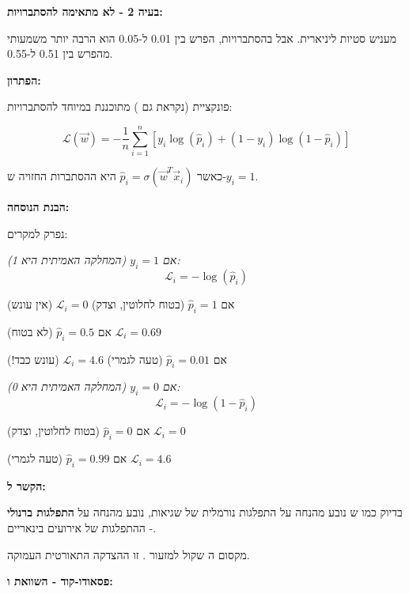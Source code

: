 \textbf{בעיה \num{2} - לא מתאימה להסתברויות:}

 מעניש סטיות ליניארית. אבל בהסתברויות, הפרש בין \num{0.01} ל-\num{0.05} הוא הרבה יותר משמעותי מהפרש בין \num{0.51} ל-\num{0.55}.

\textbf{הפתרון: }

פונקציית  (נקראת גם ) מתוכננת במיוחד להסתברויות:

\begin{equation}
\mathcal{L}(\vec{w}) = -\frac{1}{n}\sum_{i=1}^{n}\left[y_i\log(\hat{p}_i) + (1-y_i)\log(1-\hat{p}_i)\right]
\end{equation}

כאשר $\hat{p}_i = \sigma(\vec{w}^T\vec{x}_i)$ היא ההסתברות החזויה ש-$y_i = 1$.

\textbf{הבנת הנוסחה:}

נפרק למקרים:

\textit{אם $y_i = 1$ (המחלקה האמיתית היא \num{1}):}
\begin{equation}
\mathcal{L}_i = -\log(\hat{p}_i)
\end{equation}

אם $\hat{p}_i = 1$ (בטוח לחלוטין, וצדק) \rarrow{} $\mathcal{L}_i = 0$ (אין עונש)

אם $\hat{p}_i = 0.5$ (לא בטוח) \rarrow{} $\mathcal{L}_i = 0.69$

אם $\hat{p}_i = 0.01$ (טעה לגמרי) \rarrow{} $\mathcal{L}_i = 4.6$ (עונש כבד!)

\textit{אם $y_i = 0$ (המחלקה האמיתית היא \num{0}):}
\begin{equation}
\mathcal{L}_i = -\log(1-\hat{p}_i)
\end{equation}

אם $\hat{p}_i = 0$ (בטוח לחלוטין, וצדק) \rarrow{} $\mathcal{L}_i = 0$

אם $\hat{p}_i = 0.99$ (טעה לגמרי) \rarrow{} $\mathcal{L}_i = 4.6$

\textbf{הקשר ל:}

בדיוק כמו ש נובע מהנחה על התפלגות נורמלית של שגיאות,  נובע מהנחה על \textbf{התפלגות ברנולי}  - ההתפלגות של אירועים בינאריים.

מקסום ה שקול למזעור . זו ההצדקה התאורטית העמוקה.

\textbf{פסאודו-קוד - השוואת  ו:}

